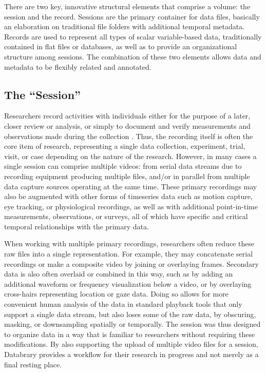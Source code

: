 \documentclass{sig-alternate}
\begin{document}
There are two key, innovative structural elements that comprise a volume: the session and the record.
Sessions are the primary container for data files, basically an elaboration on traditional file folders with additional temporal metadata.
Records are used to represent all types of scalar variable-based data, traditionally contained in flat files or databases, as well as to provide an organizational structure among sessions.
The combination of these two elements allows data and metadata to be flexibly related and annotated.

\subsection{The ``Session''}

Researchers record activities with individuals either for the purpose of a later, closer review or analysis, or simply to document and verify measurements and observations made during the collection \cite{Bakeman_2012}.
Thus, the recording itself is often the core item of research, representing a single data collection, experiment, trial, visit, or case depending on the nature of the research.
However, in many cases a single session can comprise multiple videos: from serial data streams due to recording equipment producing multiple files, and/or in parallel from multiple data capture sources operating at the same time.
These primary recordings may also be augmented with other forms of timeseries data such as motion capture, eye tracking, or physiological recordings, as well as with additional point-in-time measurements, observations, or surveys, all of which have specific and critical temporal relationships with the primary data.

When working with multiple primary recordings, researchers often reduce these raw files into a single representation.
For example, they may concatenate serial recordings or make a composite video by joining or overlaying frames.
Secondary data is also often overlaid or combined in this way, such as by adding an additional waveform or frequency visualization below a video, or by overlaying cross-hairs representing location or gaze data.
Doing so allows for more convenient human analysis of the data in standard playback tools that only support a single data stream, but also loses some of the raw data, by obscuring, masking, or downsampling spatially or temporally.
The session was thus designed to organize data in a way that is familiar to researchers without requiring these modifications.
By also supporting the upload of multiple video files for a session, Databrary provides a workflow for their research in progress and not merely as a final resting place.
\end{document}
